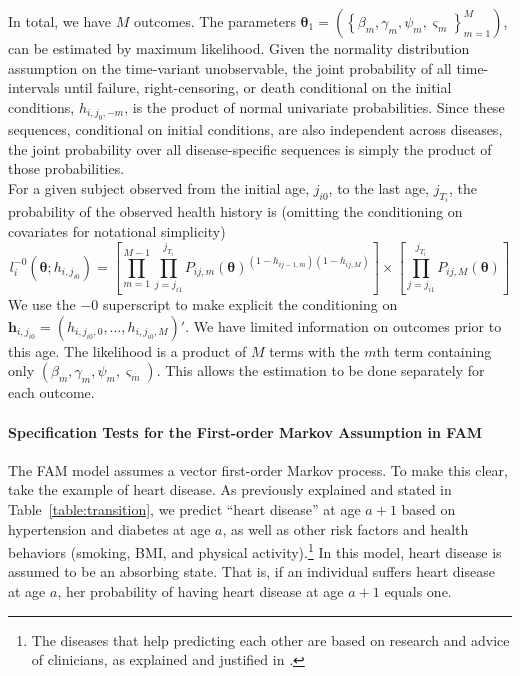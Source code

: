 \noindent In total, we have $M$ outcomes. The parameters
$\mathbf{\theta}_1 = \left(\left\{\beta_m, \gamma_m, \psi_m, \varsigma_m\right\}_{m=1}^M \right)$,
can be estimated by maximum likelihood. Given the normality distribution assumption on the
time-variant unobservable, the joint probability of all time-intervals until failure, right-censoring,
or death conditional on the initial conditions, $h_{i,j_0,-m}$, is the product of
normal univariate probabilities. Since these sequences, conditional on initial
conditions, are also independent across diseases, the joint
probability over all disease-specific sequences is simply the product of
those probabilities. \\

\noindent For a given subject observed from the initial age, $j_{i0}$, to the last age, $j_{T_i}$, the probability of the observed health history is
(omitting the conditioning on covariates for notational simplicity)
\begin{equation*}
	l^{-0}_i(\mathbf{\theta}; h_{i,j_{i0}}) = \left[\prod_{m=1}^{M-1} \prod_{j=j_{i1}}^{j_{T_i}} P_{ij,m}(\mathbf{\theta})^{(1-h_{ij-1,m})(1-h_{ij,M})} \right] \times \left[\prod_{j=j_{i1}}^{j_{T_i}} P_{ij,M}(\mathbf{\theta}) \right]
\end{equation*}
We use the ${-0}$ superscript to make explicit the conditioning on $\mathbf{h}_{i,j_{i0}} = (h_{i,j_{i0},0},\ldots,h_{i,j_{i0},M})'$. We have limited information on outcomes prior to this age.
The likelihood is a product of $M$ terms with the $m$th term containing only
$(\beta_m, \gamma_m, \psi_m, \varsigma_m)$. This allows the estimation
to be done separately for each outcome. \\

\paragraph{Specification Tests for the First-order Markov Assumption in FAM} \label{section:firstorder}

\noindent The FAM model assumes a vector first-order Markov process. To make this clear, take the example of heart disease. As previously explained and stated in Table~\ref{table:transition}, we predict ``heart disease'' at age $a+1$ based on hypertension and diabetes at age $a$, as well as other risk factors and health behaviors (smoking, BMI, and physical activity).\footnote{The diseases that help predicting each other are based on research and advice of clinicians, as explained and justified in \citet{Goldman_etal_2015_Future-Elderly-Model-Report}.} In this model, heart disease is assumed to be an absorbing state. That is, if an individual suffers heart disease at age $a$, her probability of having heart disease at age $a+1$ equals one.\\

